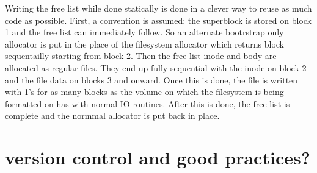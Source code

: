         Writing the free list while done statically is done in a clever way to
        reuse as much code as possible. First, a convention is assumed: the
        superblock is stored on block 1 and the free list can immediately
        follow. So an alternate bootrstrap only allocator is put in the place
        of the filesystem allocator which returns block sequentailly starting
        from block 2. Then the free list inode and body are allocated as
        regular files. They end up fully sequential with the inode on block 2
        and the file data on blocks 3 and onward. Once this is done, the file
        is written with 1's for as many blocks as the volume on which the
        filesystem is being formatted on has with normal IO routines. After
        this is done, the free list is complete and the normmal allocator is
        put back in place.

    \section{version control and good practices?}
